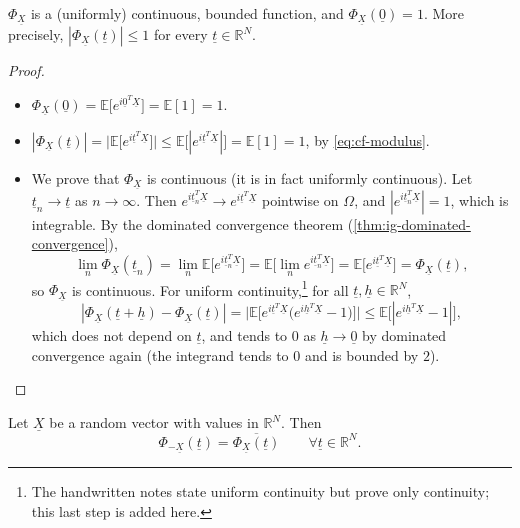\begin{proposition}\label{prop:cf-continuity}
$\Phi_{\underline X}$ is a (uniformly) continuous, bounded function, and
$\Phi_{\underline X}(\underline 0)=1$. More precisely,
$|\Phi_{\underline X}(\underline t)|\le1$ for every $\underline t\in\mathbb R^N$.
\end{proposition}

\begin{proof}
\begin{itemize}
  \item $\Phi_{\underline X}(\underline 0)=\mathbb E\big[e^{i\underline 0^T\underline X}\big]=\mathbb E[1]=1$.
  \item $|\Phi_{\underline X}(\underline t)|=\big|\mathbb E\big[e^{i\underline t^T\underline X}\big]\big|
    \le\mathbb E\big[|e^{i\underline t^T\underline X}|\big]=\mathbb E[1]=1$, by \eqref{eq:cf-modulus}.
  \item We prove that $\Phi_{\underline X}$ is continuous (it is in fact uniformly continuous).
    Let $\underline t_n\to\underline t$ as $n\to\infty$. Then
    $e^{i\underline t_n^T\underline X}\to e^{i\underline t^T\underline X}$ pointwise on $\Omega$,
    and $|e^{i\underline t_n^T\underline X}|=1$, which is integrable. By the dominated convergence
    theorem (\cref{thm:ig-dominated-convergence}),
    \[
      \lim_n\Phi_{\underline X}(\underline t_n)=\lim_n\mathbb E\big[e^{i\underline t_n^T\underline X}\big]
      =\mathbb E\big[\lim_ne^{i\underline t_n^T\underline X}\big]=\mathbb E\big[e^{i\underline t^T\underline X}\big]
      =\Phi_{\underline X}(\underline t),
    \]
    so $\Phi_{\underline X}$ is continuous. For uniform continuity,\footnote{The handwritten notes
    state uniform continuity but prove only continuity; this last step is added here.} for all
    $\underline t,\underline h\in\mathbb R^N$,
    \[
      |\Phi_{\underline X}(\underline t+\underline h)-\Phi_{\underline X}(\underline t)|
      =\big|\mathbb E\big[e^{i\underline t^T\underline X}\big(e^{i\underline h^T\underline X}-1\big)\big]\big|
      \le\mathbb E\big[|e^{i\underline h^T\underline X}-1|\big],
    \]
    which does not depend on $\underline t$, and tends to $0$ as $\underline h\to\underline 0$
    by dominated convergence again (the integrand tends to $0$ and is bounded by $2$).\qedhere
\end{itemize}
\end{proof}

\begin{proposition}\label{prop:cf-conjugate}
Let $\underline X$ be a random vector with values in $\mathbb R^N$. Then
\[
  \Phi_{-\underline X}(\underline t)=\overline{\Phi_{\underline X}(\underline t)}
  \qquad\forall\underline t\in\mathbb R^N .
\]
\end{proposition}

